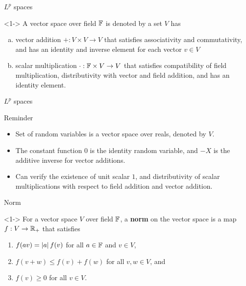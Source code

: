 \documentclass[12pt,aspectratio=169]{beamer}
\begin{document}
\begin{frame}{$L^p$ spaces}
\begin{Definition}<1->
A vector space over field $\mathbb{F}$ is denoted by a set $V$ has 
\begin{enumerate}[(a)] 
\item <2-> vector addition $+: V\times V\to V$ that satisfies associativity and commutativity, and has an identity and inverse element for each vector $v\in V$ 
\item <3-> scalar multiplication $\cdot: \mathbb{F} \times V \to V$ that satisfies compatibility of field multiplication, distributivity with vector and field addition, and has an identity element. 
\end{enumerate}
\end{Definition}
\end{frame}

\begin{frame}{$L^p$ spaces}
\begin{block}{Reminder} 
\begin{itemize}
\item <1-> Set of random variables is a vector space over reals, denoted by $V$. %
\item <2-> The constant function $0$ is the identity random variable, and $-X$ is the additive inverse for vector additions.  
\item <3-> %
Can verify the existence of unit scalar $1$, and distributivity of scalar multiplications with respect to field addition and vector addition.  
\end{itemize}
\end{block}
\end{frame}

\begin{frame}{Norm}
\begin{Definition}<1->
For a vector space $V$ over field $\mathbb{F}$, a \textbf{norm} on the vector space is a map $f: V \to \mathbb{R}_+$ 
that satisfies  
\begin{enumerate}
	\item <2-> [\textbf{homogeneity:}] $f(av) = \left\lvert a\right\rvert f(v)$ for all $a \in \mathbb{F}$ and $v \in V$,
	\item <3-> [\textbf{sub-additivity:}] $f(v+w) \le f(v) + f(w)$ for all $v,w \in V$, and 
	\item <4-> [\textbf{point-separating:}] $f(v) \ge 0$ for all $v \in V$. 
\end{enumerate}
\end{Definition}
\end{frame}
\end{document}
